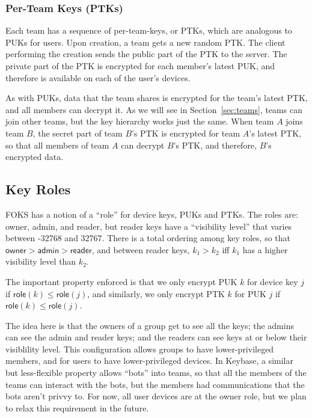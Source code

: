 \subsubsection{Per-Team Keys (PTKs)}

Each team has a sequence of per-team-keys, or PTKs, which are analogous
to PUKs for users. Upon creation, a team gets a new random PTK. The 
client performing the creation sends the public part of the PTK to the server.
The private part of the PTK is encrypted for each member's latest PUK,
and therefore is available on each of the user's devices.

As with PUKs, data that the team shares is encrypted for the team's latest PTK,
and all members can decrypt it. As we will see in Section~\ref{sec:teams}, teams can
join other teams, but the key hierarchy works just the same. When team $A$ joins
team $B$, the secret part of team $B$'s PTK is encrypted for team $A$'s latest PTK,
so that all members of team $A$ can decrypt $B$'s PTK, and therefore,
$B$'s encrypted data.

\subsection{Key Roles}

\newcommand{\owner}{\textsf{owner}}
\newcommand{\admin}{\textsf{admin}}
\newcommand{\reader}{\textsf{reader}}
\newcommand{\none}{\textsf{none}}
\newcommand{\role}[1]{\textsf{role}(#1)}


FOKS has a notion of a ``role'' for device keys, PUKs and PTKs. The roles
are: \owner, \admin, and \reader, but \reader{} keys have a ``visibility level''
that varies between -32768 and 32767. There is a total ordering among key roles,
so that $\owner > \admin > \reader$, and between reader keys, $k_1 > k_2$ iff
$k_1$ has a higher visibility level than $k_2$.

The important property enforced is that we only encrypt PUK $k$ for device key
$j$ if $\role{k} \le \role{j}$, and similarly, we only encrypt PTK $k$ for PUK
$j$ if $\role{k} \le \role{j}$.

The idea here is that the owners of a group get to see all the keys; the admins
can see the admin and reader keys; and the readers can see keys at or below
their visiblility level. This configuration allows groups to have
lower-privileged members, and for users to have lower-privileged devices. In
Keybase, a similar but less-flexible property allows ``bots'' into teams, so that
all the members of the teams can interact with the bots, but the members had
communications that the bots aren't privvy to.  For now, all user
devices are at the \owner{} role, but we plan to relax this requirement in the
future.

